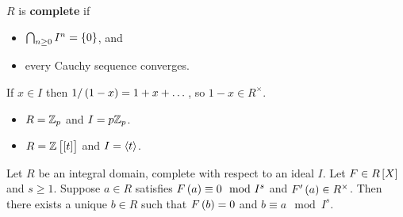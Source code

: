 \begin{definition*}
$ R $ is \textbf{complete} if
\begin{itemize}
\item $ \bigcap_{n \ge 0} I^n = \cbr{0} $, and
\item every Cauchy sequence converges.
\end{itemize}
\end{definition*}

\begin{remark*}
If $ x \in I $ then $ 1 / \br{1 - x} = 1 + x + \dots $, so $ 1 - x \in R^\times $.
\end{remark*}

\begin{example*}
\hfill
\begin{itemize}
\item $ R = \mathbb{Z}_p $ and $ I = p\mathbb{Z}_p $.
\item $ R = \ZZ\sbr{\sbr{t}} $ and $ I = \left\langle t \right\rangle $.
\end{itemize}
\end{example*}

\begin{lemma}
\label{lem:8.1}
Let $ R $ be an integral domain, complete with respect to an ideal $ I $. Let $ F \in R\sbr{X} $ and $ s \ge 1 $. Suppose $ a \in R $ satisfies $ F\br{a} \equiv 0 \mod I^s $ and $ F'\br{a} \in R^\times $. Then there exists a unique $ b \in R $ such that $ F\br{b} = 0 $ and $ b \equiv a \mod I^s $.
\end{lemma}

